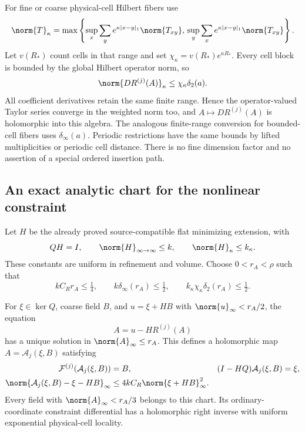 For fine or coarse physical-cell Hilbert fibers use
\begin{equation}
 \norm{T}_\kappa=\max\left\{
  \sup_x\sum_y e^{\kappa|x-y|_1}\norm{T_{xy}},\,
  \sup_y\sum_x e^{\kappa|x-y|_1}\norm{T_{xy}}\right\}.
 \label{na-schur-norm}
\end{equation}
Let $v(R_*)$ count cells in that range and set
$\chi_\kappa=v(R_*)e^{\kappa R_*}$. Every cell block is bounded
by the global Hilbert operator norm, so
\begin{equation}
 \norm{DR^{(j)}(A)}_\kappa\le\chi_\kappa\delta_2(a).
 \label{na-weighted-deviation}
\end{equation}
All coefficient derivatives retain the same finite range. Hence the
operator-valued Taylor series converge in the weighted norm too,
and $A\mapsto DR^{(j)}(A)$ is holomorphic into this algebra.
The analogous finite-range conversion for bounded-cell fibers uses
$\delta_\infty(a)$. Periodic restrictions have the same bounds by
lifted multiplicities or periodic cell distance. There is no fine
dimension factor and no assertion of a special ordered insertion
path.

\subsection{An exact analytic chart for the nonlinear constraint}
\label{na-chart}

Let $H$ be the already proved source-compatible flat minimizing
extension, with
\begin{equation}
 QH=I,\qquad \norm{H}_{\infty\to\infty}\le k,
 \qquad \norm{H}_\kappa\le k_\kappa.
 \label{na-H-input}
\end{equation}
These constants are uniform in refinement and volume. Choose
$0<r_A<\rho$ such that
\begin{equation}
 kC_Rr_A\le\tfrac14,\qquad
 k\delta_\infty(r_A)\le\tfrac12,\qquad
 k_\kappa\chi_\kappa\delta_2(r_A)\le\tfrac12.
 \label{na-chart-radius}
\end{equation}

\begin{theorem}
\label{na-chart-theorem}
For $\xi\in\ker Q$, coarse field $B$, and
$u=\xi+HB$ with $\norm{u}_\infty<r_A/2$, the equation
\begin{equation}
 A=u-HR^{(j)}(A)
 \label{na-fixed-point}
\end{equation}
has a unique solution in $\norm{A}_\infty\le r_A$. This defines
a holomorphic map $A=\mathcal A_j(\xi,B)$ satisfying
\begin{align}
 \mathcal F^{(j)}(\mathcal A_j(\xi,B))&=B,
 & (I-HQ)\mathcal A_j(\xi,B)&=\xi,
 \label{na-chart-identities}\\
 \norm{\mathcal A_j(\xi,B)-\xi-HB}_\infty
   &\le4kC_R\norm{\xi+HB}_\infty^2.
 \label{na-chart-remainder}
\end{align}
Every field with $\norm{A}_\infty<r_A/3$ belongs to this chart.
Its ordinary-coordinate constraint differential has a holomorphic
right inverse with uniform exponential physical-cell locality.
\end{theorem}

